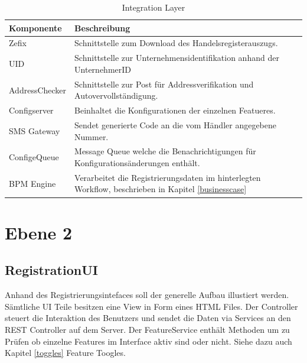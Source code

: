 \begin{table}[H]
	\centering
	\caption{Integration Layer}
	\begin{tabular}{ | p{4cm} | p{12cm} | }
		\toprule
		{\textbf{Komponente}} & {\textbf{Beschreibung}} \\
		\midrule
		Zefix &  Schnittstelle zum Download des Handelsregisterauszugs. \\ \hline
		UID &  Schnittstelle zur Unternehmensidentifikation anhand der UnternehmerID \\ \hline
		AddressChecker &  Schnittstelle zur Post für Addressverifikation und Autovervollständigung. \\ \hline
		Configserver &  Beinhaltet die Konfigurationen der einzelnen Featueres. \\ \hline
		SMS Gateway &  Sendet generierte Code an die vom Händler angegebene Nummer. \\ \hline
		ConfigeQueue & Message Queue welche die Benachrichtigungen für Konfigurationsänderungen enthält. \\ \hline
		BPM Engine & Verarbeitet die Registrierungsdaten im hinterlegten Workflow, beschrieben in Kapitel \ref{businesscase}\\
		\bottomrule
	\end{tabular}
\end{table}
\newpage

\section{Ebene 2}

\subsection{RegistrationUI}
Anhand des Registrierungsintefaces soll der generelle Aufbau illustiert werden. Sämtliche UI Teile besitzen eine View in Form eines HTML Files. Der Controller steuert die Interaktion des Benutzers und sendet die Daten via Services an den REST Controller auf dem Server. Der FeatureService enthält Methoden um zu Prüfen ob einzelne Features im Interface aktiv sind oder nicht. Siehe dazu auch Kapitel \ref{toggles} Feature Toogles.


